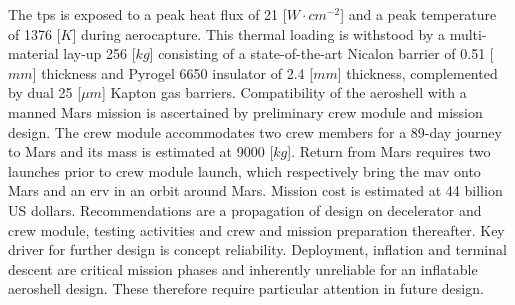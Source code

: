 \newline
\newline
The \acrlong{tps} is exposed to a peak heat flux of 21 [$W \cdot cm^{-2}$] and a peak temperature of 1376 [$K$] during aerocapture. This thermal loading is withstood by a multi-material lay-up 256 [$kg$] consisting of a state-of-the-art Nicalon barrier of 0.51 [$mm$] thickness and Pyrogel 6650 insulator of 2.4 [$mm$] thickness, complemented by dual 25 [$\mu m$] Kapton gas barriers. 
\newline
\newline
Compatibility of the aeroshell with a manned Mars mission is ascertained by preliminary crew module and mission design. The crew module accommodates two crew members for a 89-day journey to Mars and its mass is estimated at 9000 [$kg$]. Return from Mars requires two launches prior to crew module launch, which respectively bring the \acrlong{mav} onto Mars and an \acrlong{erv} in an orbit around Mars. Mission cost is estimated at 44 billion US dollars.
\newline
\newline
Recommendations are a propagation of design on decelerator and crew module, testing activities and crew and mission preparation thereafter. Key driver for further design is concept reliability. Deployment, inflation and terminal descent are critical mission phases and inherently unreliable for an inflatable aeroshell design. These therefore require particular attention in future design.






